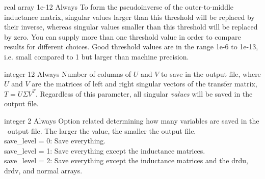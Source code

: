 \myhrule

{real array}
{1e-12}
{Always}
{To form the pseudoinverse of the outer-to-middle inductance matrix, singular values larger than this threshold
will be replaced by their inverse, whereas singular values smaller than this threshold will be replaced by zero.
You can supply more than one threshold value in order to compare results for different choices.
Good threshold values are in the range 1e-6 to 1e-13, i.e. small compared to 1 but larger than machine precision.}

\myhrule

{integer}
{12}
{Always}
{Number of columns of $U$ and $V$ to save in the output file, where $U$ and $V$ are the matrices of left and right singular vectors of the transfer matrix,
$T = U\Sigma V^{T}$.
Regardless of this parameter, all singular \emph{values} will be saved in the output file.}

\myhrule

{integer}
{2}
{Always}
{Option related determining how many variables are saved in the \netCDF~output file.  The larger the value, the smaller the output file.\\

{\ttfamily save\_level} = 0: Save everything.\\

{\ttfamily save\_level} = 1: Save everything except the inductance matrices.\\

{\ttfamily save\_level} = 2: Save everything except the inductance matrices and the {\ttfamily drdu}, {\ttfamily drdv}, and {\ttfamily normal} arrays.
}

